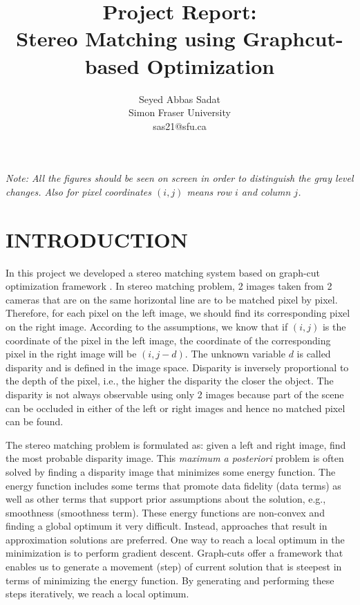 \documentclass[letterpaper, 10 pt, conference]{ieeeconf}  %
\title{Project Report:\\\LARGE \bf
Stereo Matching using Graphcut-based Optimization}
\author{Seyed Abbas Sadat\\
Simon Fraser University\\
sas21@sfu.ca%
}
\begin{document}
\maketitle
\thispagestyle{empty}
\pagestyle{empty}

\emph{Note: All the figures should be seen on screen in order to distinguish the gray level changes. Also for pixel coordinates $(i,j)$ means row $i$ and column $j$.}


\section{INTRODUCTION}

In this project we developed a stereo matching system based on graph-cut optimization framework \cite{boykov2001fast}. In stereo matching problem, 2 images taken from 2 cameras that are on the same horizontal line are to be matched pixel by pixel. Therefore, for each pixel on the left image, we should find its corresponding pixel on the right image. According to the assumptions, we know that if $(i,j)$ is the coordinate of the pixel in the left image, the coordinate of the corresponding pixel in the right image will be $(i,j-d)$. The unknown variable $d$ is called disparity and is defined in the image space. Disparity is inversely proportional to the depth of the pixel, i.e., the higher the disparity the closer the object. The disparity is not always observable using only 2 images because part of the scene can be occluded in either of the left or right images and hence no matched pixel can be found.

The stereo matching problem is formulated as: given a left and right image, find the most probable disparity image. This \emph{maximum a posteriori} problem is often solved by finding a disparity image that minimizes some energy function. The energy function includes some terms that promote data fidelity (data terms) as well as other terms that support prior assumptions about the solution, e.g., smoothness (smoothness term). These energy functions are non-convex and finding a global optimum it very difficult. Instead, approaches that result in approximation solutions are preferred. One way to reach a local optimum in the minimization is to perform gradient descent. Graph-cuts offer a framework that enables us to generate a movement (step) of current solution that is steepest in terms of minimizing the energy function. By generating and performing these steps iteratively, we reach a local optimum. 
\end{document}
